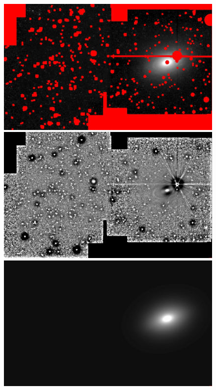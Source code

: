 \documentclass[preprint2]{emulateapj}
\begin{document}
\begin{figure}[h]
\begin{center}
\includegraphics[width=\columnwidth]{images/n2974_imgmsk.jpeg}
\includegraphics[width=\columnwidth]{images/n2974_unsharp.jpeg}
\includegraphics[width=\columnwidth]{images/n2974_model.jpeg}

\end{center}
\end{figure}
\end{document}
